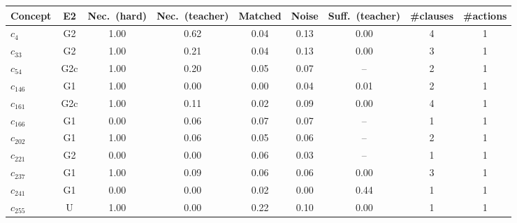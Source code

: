 \begin{tabular}{lcccccccc}
\toprule
Concept & E2 & Nec.\ (hard) & Nec.\ (teacher) & Matched & Noise & Suff.\ (teacher) & \#clauses & \#actions \\
\midrule
$c_{4}$ & G2 & 1.00 & 0.62 & 0.04 & 0.13 & 0.00 & 4 & 1 \\
$c_{33}$ & G2 & 1.00 & 0.21 & 0.04 & 0.13 & 0.00 & 3 & 1 \\
$c_{54}$ & G2c & 1.00 & 0.20 & 0.05 & 0.07 & -- & 2 & 1 \\
$c_{146}$ & G1 & 1.00 & 0.00 & 0.00 & 0.04 & 0.01 & 2 & 1 \\
$c_{161}$ & G2c & 1.00 & 0.11 & 0.02 & 0.09 & 0.00 & 4 & 1 \\
$c_{166}$ & G1 & 0.00 & 0.06 & 0.07 & 0.07 & -- & 1 & 1 \\
$c_{202}$ & G1 & 1.00 & 0.06 & 0.05 & 0.06 & -- & 2 & 1 \\
$c_{221}$ & G2 & 0.00 & 0.00 & 0.06 & 0.03 & -- & 1 & 1 \\
$c_{237}$ & G1 & 1.00 & 0.09 & 0.06 & 0.06 & 0.00 & 3 & 1 \\
$c_{241}$ & G1 & 0.00 & 0.00 & 0.02 & 0.00 & 0.44 & 1 & 1 \\
$c_{255}$ & U & 1.00 & 0.00 & 0.22 & 0.10 & 0.00 & 1 & 1 \\
\bottomrule
\end{tabular}